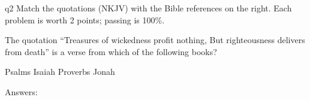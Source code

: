 \documentclass{article}
\begin{document}

\begin{quiz*}{q2}
Match the quotations (\textsf{NKJV)} with the Bible references on the right.
Each problem is worth 2 points; passing is 100\%.

\useMCCircles

\noindent
\begin{minipage}[t]{.75\linewidth-\eflength}
\begin{questions}
\useNumbersOn
\adjCAB{\makebox[0pt][l]{\enspace#2\enspace}}
\begin{BblPsg}
  \item{}
  \item{}
  \item{}
\end{BblPsg}
\item{} The quotation ``Treasures of wickedness profit nothing, But righteousness delivers from death''
is a verse from which of the following books?
\begin{answers}{4}
  \bChoices
     Psalms\eAns
     Isaiah\eAns
     Proverbs\eAns
     Jonah\eAns
    \eChoices
\end{answers}


\end{questions}
\end{minipage}%
\hfill
\begin{minipage}[t]{.25\linewidth}
\begin{questions}[itemsep={0pt},labelwidth={1em}]
\begin{BblVrs}
  \item{}
  \item{}
  \item{}
  \item{}
  \item{}
  \item{}
\end{BblVrs}
\end{questions}
\end{minipage}\hfil
\par\medskip
\end{quiz*}\quad\PointsField\currQuiz\olBdry\CorrButton\currQuiz\cgBdry[6pt]
Answers: \vcgBdry[6pt]
\end{document}
